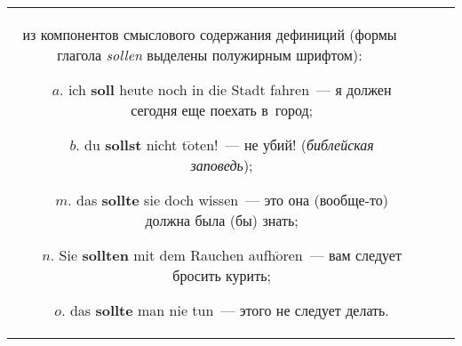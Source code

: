 \begin{multicols}{2}
\begin{table*}
\begin{center}
\begin{tabular}{|c|c|c|p{120mm}|}
{из компонентов смыслового содержания дефиниций (формы глагола \textit{sollen} выделены 
полужирным шрифтом):
\begin{itemize}
\addtolength{\itemsep}{-4pt}
\item[$a$.] ich \textbf{soll} heute noch in die Stadt fahren~--- я должен сегодня еще поехать 
в~город;
\item[$b$.] du \textbf{sollst} nicht t$\ddot{\mbox{o}}$ten!~--- не убий! 
(\textit{библейская заповедь});
\item[$m$.] das \textbf{sollte} sie doch wissen~--- это она (вообще-то) должна была (бы) 
знать;
\item[$n$.] Sie \textbf{sollten} mit dem Rauchen aufh$\ddot{\mbox{o}}$ren~--- вам следует 
бросить курить;
\item[$o$.] das \textbf{sollte} man nie tun~--- этого не следует делать.
\end{itemize}
}
\end{tabular}
\end{center}
\vspace*{-23pt}
\begin{center}
\vspace*{2ex}


\end{center}
\end{table*}
\end{multicols}
